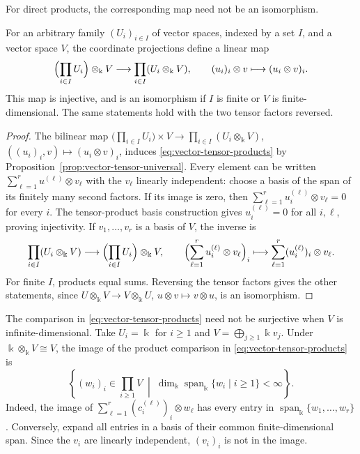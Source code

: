 \begin{advanced}
For direct products, the corresponding map need not be an isomorphism.

\begin{lemma}\label{lem:vector-tensor-products}
For an arbitrary family $(U_i)_{i\in I}$ of vector spaces, indexed by a set $I$, and a vector space $V$, the coordinate projections define a linear map
\begin{equation}\label{eq:vector-tensor-products}
\Bigl(\prod_{i\in I}U_i\Bigr)\otimes_\Bbbk V
\longrightarrow\prod_{i\in I}(U_i\otimes_\Bbbk V),
\qquad (u_i)_i\otimes v\longmapsto(u_i\otimes v)_i.
\end{equation}
This map is injective, and is an isomorphism if $I$ is finite or $V$ is finite-dimensional.
The same statements hold with the two tensor factors reversed.
\end{lemma}

\begin{proof}
The bilinear map $\bigl(\prod_{i\in I}U_i\bigr)\times V\to\prod_{i\in I}(U_i\otimes_\Bbbk V)$, $((u_i)_i,v)\mapsto(u_i\otimes v)_i$, induces \eqref{eq:vector-tensor-products} by Proposition~\ref{prop:vector-tensor-universal}.
Every element can be written $\sum_{\ell=1}^r u^{(\ell)}\otimes v_\ell$ with the $v_\ell$ linearly independent: choose a basis of the span of its finitely many second factors.
If its image is zero, then $\sum_{\ell=1}^r u_i^{(\ell)}\otimes v_\ell=0$ for every $i$.
The tensor-product basis construction gives $u_i^{(\ell)}=0$ for all $i,\ell$, proving injectivity.
If $v_1,\ldots,v_r$ is a basis of $V$, the inverse is
\[
\prod_{i\in I}(U_i\otimes_\Bbbk V)\longrightarrow
\Bigl(\prod_{i\in I}U_i\Bigr)\otimes_\Bbbk V,\qquad
\Bigl(\sum_{\ell=1}^r u_i^{(\ell)}\otimes v_\ell\Bigr)_i
\longmapsto\sum_{\ell=1}^r(u_i^{(\ell)})_i\otimes v_\ell.
\]
For finite $I$, products equal sums.
Reversing the tensor factors gives the other statements, since $U\otimes_\Bbbk V\to V\otimes_\Bbbk U$, $u\otimes v\mapsto v\otimes u$, is an isomorphism.
\end{proof}

\begin{example}\label{ex:tensor-product-product-failure}
The comparison in \eqref{eq:vector-tensor-products} need not be surjective when $V$ is infinite-dimensional.
Take $U_i=\Bbbk$ for $i\geq1$ and $V=\bigoplus_{j\geq1}\Bbbk v_j$.
Under $\Bbbk\otimes_\Bbbk V\cong V$, the image of the product comparison in \eqref{eq:vector-tensor-products} is
\[
\left\{(w_i)_i\in\prod_{i\geq1}V\;\middle|\;
\dim_\Bbbk\operatorname{span}_\Bbbk\{w_i\mid i\geq1\}<\infty\right\}.
\]
Indeed, the image of $\sum_{\ell=1}^r(c_i^{(\ell)})_i\otimes w_\ell$ has every entry in $\operatorname{span}_\Bbbk\{w_1,\ldots,w_r\}$.
Conversely, expand all entries in a basis of their common finite-dimensional span.
Since the $v_i$ are linearly independent, $(v_i)_i$ is not in the image.
\end{example}
\end{advanced}

